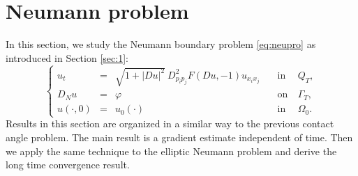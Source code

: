 \documentclass[12pt]{article}
\numberwithin{equation}{section}
\theoremstyle{plain}
\theoremstyle{definition}
\theoremstyle{remark}
\begin{document}

\section{Neumann problem} \label{sec:4}
In this section, we study the Neumann boundary problem \eqref{eq:neupro} as introduced in Section \ref{sec:1}:
\begin{equation} \label{eq:Neupro}
    \left\{ \begin{array}{cllcl}
            u_t & = & \sqrt{1+|Du|^2} \  D^2_{p_i p_j} F (Du,-1) u_{x_i x_j}   \quad &  \text{in} & \ {Q}_T , \\
            D_N u & = & \varphi  \quad &  \text{on} & \ \Gamma_T ,  \\
         u(\cdot,0) & = & u_0(\cdot)  \quad \ & \text{in} & \  \Omega_0 .
    \end{array}  \right.
\end{equation}
 Results in this section are organized in a similar way to the previous contact angle problem. The main result is a gradient estimate independent of time. Then we apply the same technique to the elliptic Neumann problem and derive the long time convergence result.
\end{document}
